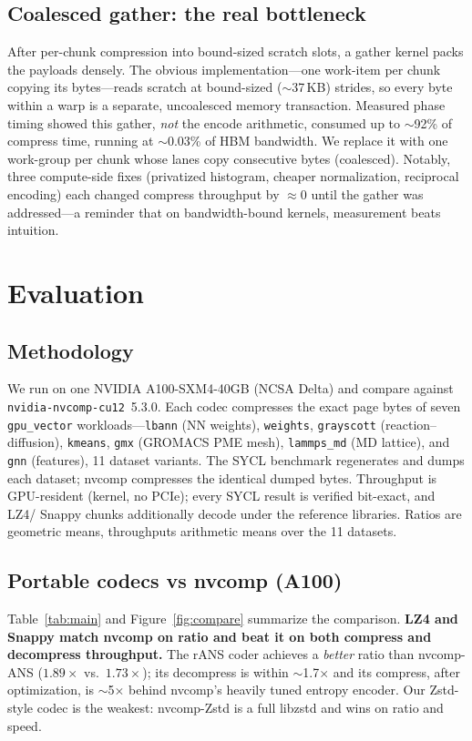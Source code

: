\documentclass[sigconf,review,anonymous]{acmart}
\begin{document}
\subsection{Coalesced gather: the real bottleneck}
After per-chunk compression into bound-sized scratch slots, a gather kernel packs
the payloads densely. The obvious implementation---one work-item per chunk
copying its bytes---reads scratch at bound-sized ($\sim$37\,KB) strides, so every
byte within a warp is a separate, uncoalesced memory transaction. Measured phase
timing showed this gather, \emph{not} the encode arithmetic, consumed up to
$\sim$92\% of compress time, running at $\sim$0.03\% of HBM bandwidth. We replace
it with one work-group per chunk whose lanes copy consecutive bytes (coalesced).
Notably, three compute-side fixes (privatized histogram, cheaper normalization,
reciprocal encoding) each changed compress throughput by $\approx$0 until the
gather was addressed---a reminder that on bandwidth-bound kernels, measurement
beats intuition.

\section{Evaluation}
\subsection{Methodology}
We run on one NVIDIA A100-SXM4-40GB (NCSA Delta) and compare against
\texttt{nvidia-nvcomp-cu12}~5.3.0. Each codec compresses the exact page bytes of
seven \texttt{gpu\_vector} workloads---\texttt{lbann} (NN weights),
\texttt{weights}, \texttt{grayscott} (reaction--diffusion), \texttt{kmeans},
\texttt{gmx} (GROMACS PME mesh), \texttt{lammps\_md} (MD lattice), and
\texttt{gnn} (features), 11 dataset variants. The SYCL benchmark regenerates and
dumps each dataset; nvcomp compresses the identical dumped bytes. Throughput is
GPU-resident (kernel, no PCIe); every SYCL result is verified bit-exact, and LZ4/
Snappy chunks additionally decode under the reference libraries. Ratios are
geometric means, throughputs arithmetic means over the 11 datasets.

\subsection{Portable codecs vs nvcomp (A100)}
Table~\ref{tab:main} and Figure~\ref{fig:compare} summarize the comparison.
\textbf{LZ4 and Snappy match nvcomp on ratio and beat it on both compress and
decompress throughput.} The rANS coder achieves a \emph{better} ratio than
nvcomp-ANS ($1.89\times$ vs.\ $1.73\times$); its decompress is within $\sim$1.7$\times$
and its compress, after optimization, is $\sim$5$\times$ behind nvcomp's heavily
tuned entropy encoder. Our Zstd-style codec is the weakest: nvcomp-Zstd is a full
libzstd and wins on ratio and speed.
\end{document}
